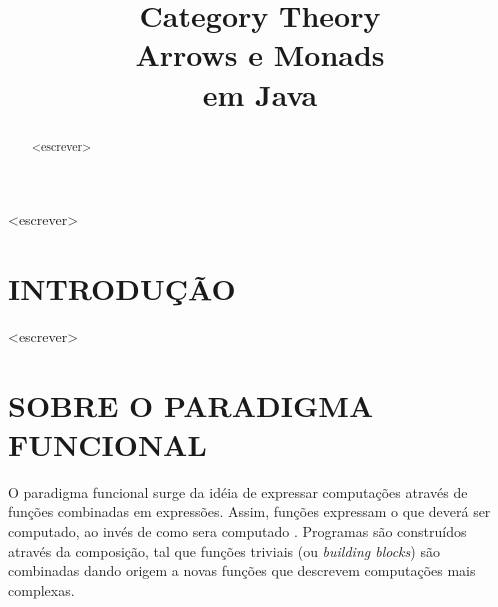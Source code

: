 \documentclass[10pt, conference]{IEEEtran}
\begin{document}
\title { 
	Category Theory \\
	Arrows e Monads \\
	em Java 
}

\author{


	\and	
	
}
					  
\maketitle

\begin{abstract}

<escrever>

\end{abstract}

\begin{IEEEkeywords}

<escrever>

\end{IEEEkeywords}

\section{INTRODU\c{C}\~AO}
\label{sec:intro}

<escrever>

\section{SOBRE O PARADIGMA FUNCIONAL}


O paradigma funcional surge da id\'eia de expressar computa\c{c}\~oes atrav\'es de fun\c{c}\~oes combinadas em express\~oes. Assim, fun\c{c}\~oes expressam o que dever\'a ser computado, ao inv\'es de como sera computado \cite{louden2011programming}. Programas s\~ao constru\'idos atrav\'es da composi\c{c}\~ao, tal que fun\c{c}\~oes triviais (ou \textit{building blocks}) s\~ao combinadas dando origem a novas fun\c{c}\~oes que descrevem computa\c{c}\~oes mais complexas.
\end{document}

